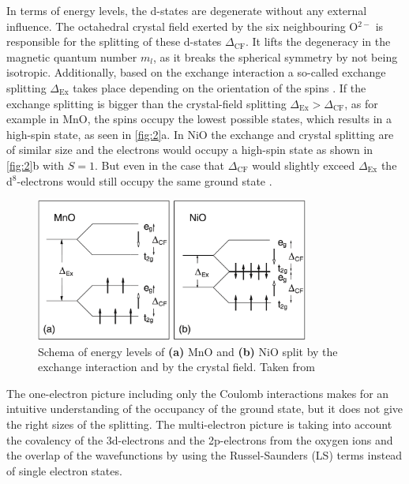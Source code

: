In terms of energy levels, the d-states are degenerate without any external influence.
The octahedral crystal field exerted by the six neighbouring O$^{2-}$ is responsible for the splitting of these d-states $\Delta_{\text{CF}}$.
It lifts the degeneracy in the magnetic quantum number $m_l$, as it breaks the spherical symmetry by not being isotropic.
Additionally, based on the exchange interaction a so-called exchange splitting $\Delta_{\text{Ex}}$ takes place depending on the orientation of the spins \cite{khomskii_orbital_2021}.
If the exchange splitting is bigger than the crystal-field splitting $\Delta_{\text{Ex}} > \Delta_{\text{CF}}$, as for example in MnO, the spins occupy the lowest possible states, which results in a high-spin state, as seen in \autoref{fig:2}a.
In NiO the exchange and crystal splitting are of similar size and the electrons would occupy a high-spin state as shown in \autoref{fig:2}b with $S=1$. But even in the case that $\Delta_{\text{CF}}$ would slightly exceed $\Delta_{\text{Ex}}$ the d$^8$-electrons would still occupy the same ground state \cite{fromme_b_d-d_2001}.
\begin{figure}[ht]
    \centering
    \includegraphics[width=0.8\textwidth]{pictures/2.png}
    \caption{Schema of energy levels of \textbf{(a)} MnO and \textbf{(b)} NiO split by the exchange interaction and by the crystal field. Taken from \cite{fromme_b_d-d_2001}}
    \label{fig:2}
\end{figure}
\FloatBarrier
The one-electron picture including only the Coulomb interactions makes for an intuitive understanding of the occupancy of the ground state, but it does not give the right sizes of the splitting.
The multi-electron picture is taking into account the covalency of the 3d-electrons and the 2p-electrons from the oxygen ions and the overlap of the wavefunctions by using the Russel-Saunders (LS) terms instead of single electron states.
